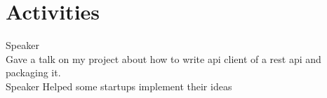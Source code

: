 \documentclass[]{deedy-resume-openfont}
\begin{document}
\begin{minipage}[t]{0.33\textwidth}

\section{Activities}
\textbullet{} Speaker \\
\textbullet{} Gave a talk on my project about how to write api client of a  rest api and packaging it. \\
\textbullet{} Speaker
\textbullet{} Helped some startups implement their ideas \\
\sectionsep



%
%

\end{minipage}
\hfill
\end{document}
